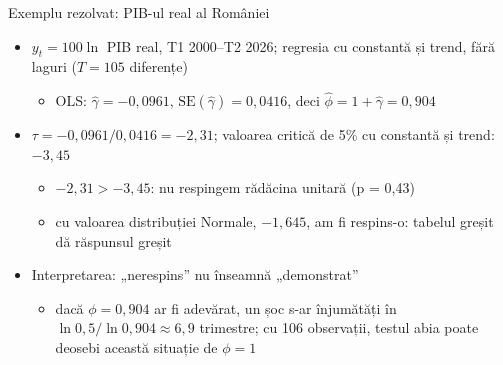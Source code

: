 \begin{frame}{Exemplu rezolvat: PIB-ul real al României}
\itemsize{\small}
\begin{itemize}
    \item $y_t = 100\ln$ PIB real, T1 2000--T2 2026; regresia cu constantă și trend, fără laguri ($T = 105$ diferențe)
    \begin{itemize}
        \item OLS: $\hat\gamma = \ensuremath{-}0{,}0961$, $\mathrm{SE}(\hat\gamma) = 0{,}0416$, deci $\hat\phi = 1 + \hat\gamma = 0{,}904$
    \end{itemize}
    \item $\tau = \ensuremath{-}0{,}0961/0{,}0416 = \ensuremath{-}2{,}31$; valoarea critică de 5\% cu constantă și trend: $\ensuremath{-}3{,}45$
    \begin{itemize}
        \item $\ensuremath{-}2{,}31 > \ensuremath{-}3{,}45$: nu respingem rădăcina unitară (p = 0{,}43)
        \item cu valoarea distribuției Normale, $-1{,}645$, am fi respins-o: tabelul greșit dă răspunsul greșit
    \end{itemize}
    \item Interpretarea: „nerespins” nu înseamnă „demonstrat”
    \begin{itemize}
        \item dacă $\phi = 0{,}904$ ar fi adevărat, un șoc s-ar înjumătăți în $\ln 0{,}5/\ln 0{,}904 \approx 6{,}9$ trimestre; cu 106 observații, testul abia poate deosebi această situație de $\phi = 1$
    \end{itemize}
\end{itemize}
\end{frame}

